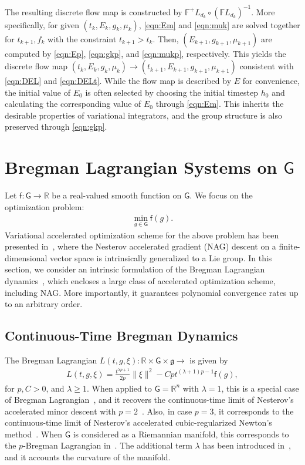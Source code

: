 \documentclass[letterpaper, 10pt, conference]{ieeeconf}
\newcommand{\G}{\ensuremath{\mathsf{G}}}
\renewcommand{\Re}{\ensuremath{\mathbb{R}}}
\newcommand{\g}{\ensuremath{\mathfrak{g}}}
\begin{document}
The resulting discrete flow map is constructed by $\mathbb{F}^+L_{d_k} \circ (\mathbb{F}L_{d_k})^{-1}$. 
More specifically, for given $(t_k, E_k, g_k, \mu_k)$, \eqref{eqn:Em} and \eqref{eqn:muk} are solved together for $t_{k+1},f_k$ with the constraint $t_{k+1}>t_k$.
Then, $(E_{k+1}, g_{k+1},\mu_{k+1})$ are computed by \eqref{eqn:Ep}, \eqref{eqn:gkp}, and \eqref{eqn:mukp}, respectively.
This yields the discrete flow map $(t_k, E_k, g_k, \mu_k)\rightarrow(t_{k+1}, E_{k+1}, g_{k+1}, \mu_{k+1})$ consistent with \eqref{eqn:DEL} and \eqref{eqn:DELt}.
While the flow map is described by $E$ for convenience, the initial value of $E_0$ is often selected by choosing the initial timestep $h_0$ and calculating the corresponding value of $E_0$ through \eqref{eqn:Em}.
This inherits the desirable properties of variational integrators, and the group structure is also preserved through \eqref{eqn:gkp}.

\section{Bregman Lagrangian Systems on $\G$}\label{sec:Breg}

\newcommand{\obj}{\mathsf{f}}

Let $\obj:\G\rightarrow\Re$ be a real-valued smooth function on $\G$.
We focus on the optimization problem:
\begin{align}
    \min_{g\in\G} \obj (g).
\end{align}
Variational accelerated optimization scheme for the above problem has been presented in~\cite{tao2020variational}, where the Nesterov accelerated gradient (NAG) descent on a finite-dimensional vector space is intrinsically generalized to a Lie group. 
In this section, we consider an intrinsic formulation of the Bregman Lagrangian dynamics~\cite{wibisono2016variational}, which encloses a large class of accelerated optimization scheme, including NAG.
More importantly, it guarantees polynomial convergence rates up to an arbitrary order.

\subsection{Continuous-Time Bregman Dynamics}

The Bregman Lagrangian $L(t,g,\xi):\Re\times\G\times\g\rightarrow$ is given by
\begin{align}
    L(t,g,\xi) = \frac{t^{\lambda p+1}}{2p} \|\xi\|^2 - C p t^{(\lambda+1)p-1} \obj (g),\label{eqn:BL}
\end{align}
for $p, C>0$, and $\lambda\geq 1$.
When applied to $\G=\Re^n$ with $\lambda=1$, this is a special case of Bregman Lagrangian~\cite{wibisono2016variational}, and it recovers the continuous-time limit of Nesterov's accelerated minor descent with $p=2$~\cite{nesterov2005smooth}.
Also, in case $p = 3$, it corresponds to the continuous-time limit of Nesterov’s accelerated cubic-regularized Newton’s method~\cite{nesterov2008accelerating}.
When $\G$ is considered as a Riemannian manifold, this corresponds to the $p$-Bregman Lagrangian in~\cite{duruisseaux2021variational}.
The additional term $\lambda$ has been introduced in~\cite{alimisis2020continuous}, and it accounts the curvature of the manifold. 
\end{document}
